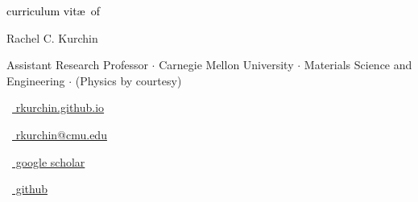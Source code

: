 \begin{scriptsize}
	 \textcolor{black}{curriculum vit\ae~of}
\end{scriptsize}

\vspace*{-0.10em}
\begin{Large} 
	Rachel C. Kurchin
\end{Large}

\vspace*{0.25em}
\begin{scshape}
	\begin{footnotesize}
		  \textcolor{highlight2}{Assistant Research Professor $\cdot$ Carnegie Mellon University $\cdot$ Materials Science and Engineering $\cdot$ (Physics by courtesy)}
		  
	\end{footnotesize}
\end{scshape}
\vspace*{0.1cm}

\begin{footnotesize}
	\begin{tiny}\faHome\end{tiny}~\href{https://rkurchin.github.io}{
		rkurchin.github.io
	}
	\quad \begin{tiny}\faEnvelope[regular]\end{tiny}~\href{mailto:rkurchin@cmu.edu}{%
		rkurchin@cmu.edu
	} 	
	\quad \begin{tiny}\faGraduationCap\end{tiny}~\href{https://scholar.google.com/citations?user=rkurchin&hl=en}{
		 google scholar
		}
	\quad \begin{tiny}\faGithub[regular]\end{tiny}~\href{https://github.com/rkurchin}{%
		github
	} 

\end{footnotesize}
